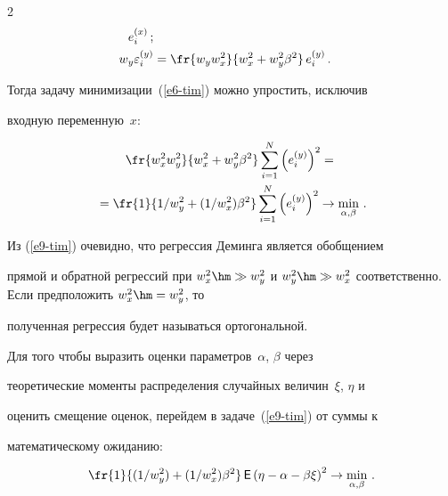 \begin{multicols}{2}
\begin{align*}
\,e^{(x)}_i\,;\\

 w_y \varepsilon_i^{(y)} &= \fr{w_y w_x^2}{w_x^2

+w_y^2\beta^2}\, e^{(y)}_i\,.

\end{align*}



  Тогда задачу минимизации~(\ref{e6-tim}) можно упростить, исключив

входную переменную~$x$:

  \begin{multline}

  \fr{w_x^2w_y^2}{w_x^2+w_y^2\beta^2}\sum\limits_{i=1}^N \left(

e_i^{(y)}\right)^2 ={}\\

{}= \fr{1}{1/w_y^2+(1/w_x^2)\beta^2} \sum\limits_{i=1}^N

\left( e_i^{(y)}\right)^2\to \min\limits_{\alpha,\beta}\,.

  \label{e9-tim}

  \end{multline}



  Из (\ref{e9-tim}) очевидно, что регрессия Деминга является обобщением

прямой и обратной регрессий при $w_x^2\hm\gg w_y^2$ и $w_y^2\hm\gg

w_x^2$ соответственно. Если предположить $w_x^2\hm=w_y^2$, то

полученная регрессия будет называться ортогональной.



  Для того чтобы выразить оценки параметров~$\alpha$, $\beta$ через

теоретические моменты распределения случайных величин~$\xi$, $\eta$ и

оценить смещение оценок, перейдем в задаче~(\ref{e9-tim}) от суммы к

математическому ожиданию:

  \begin{equation}

  \fr{1}{(1/w_y^2)+(1/w_x^2)\beta^2}\,{\sf E}\left( \eta-\alpha-\beta\xi\right)^2\to

\min\limits_{\alpha,\beta}\,.

  \label{e10-tim}

  \end{equation}




\end{multicols}
